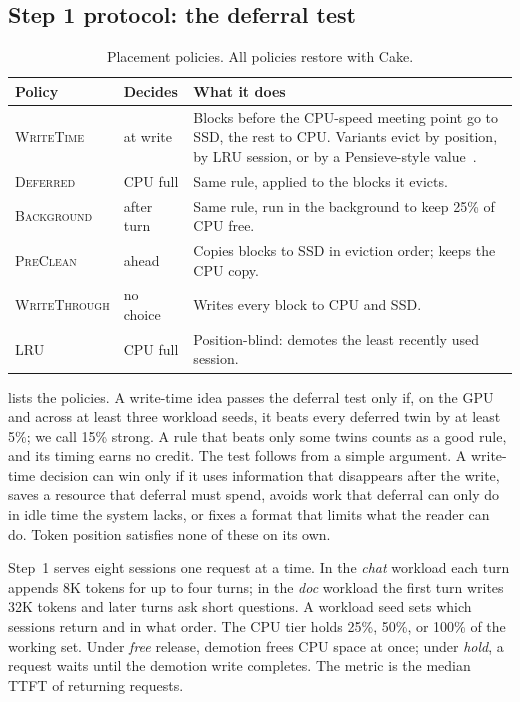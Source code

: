 \documentclass[conference]{IEEEtran}
\newcommand{\pol}[1]{\textsc{#1}}
\begin{document}
\subsection{Step 1 protocol: the deferral test}\label{sec:method-placement}

\begin{table}[t]
\centering
\caption{Placement policies. All policies restore with Cake.}
\label{tab:policies}
\footnotesize
\begin{tabular}{@{}l l p{4.2cm}@{}}
\toprule
Policy & Decides & What it does \\
\midrule
\pol{WriteTime} & at write & Blocks before the CPU-speed meeting point go to SSD, the rest to CPU. Variants evict by position, by LRU session, or by a Pensieve-style value~\cite{pensieve2025}. \\
\midrule
\pol{Deferred} & CPU full & Same rule, applied to the blocks it evicts. \\
\pol{Background} & after turn & Same rule, run in the background to keep 25\% of CPU free. \\
\pol{PreClean} & ahead & Copies blocks to SSD in eviction order; keeps the CPU copy. \\
\pol{WriteThrough} & no choice & Writes every block to CPU and SSD. \\
\midrule
\pol{LRU} & CPU full & Position-blind: demotes the least recently used session. \\
\bottomrule
\end{tabular}
\end{table}

 lists the policies.
A write-time idea passes the deferral test only if, on the GPU and across at least three workload seeds, it beats every deferred twin by at least 5\%; we call 15\% strong.
A rule that beats only some twins counts as a good rule, and its timing earns no credit.
The test follows from a simple argument.
A write-time decision can win only if it uses information that disappears after the write, saves a resource that deferral must spend, avoids work that deferral can only do in idle time the system lacks, or fixes a format that limits what the reader can do.
Token position satisfies none of these on its own.

Step~1 serves eight sessions one request at a time.
In the \emph{chat} workload each turn appends 8K tokens for up to four turns; in the \emph{doc} workload the first turn writes 32K tokens and later turns ask short questions.
A workload seed sets which sessions return and in what order.
The CPU tier holds 25\%, 50\%, or 100\% of the working set.
Under \emph{free} release, demotion frees CPU space at once; under \emph{hold}, a request waits until the demotion write completes.
The metric is the median TTFT of returning requests.
\end{document}

